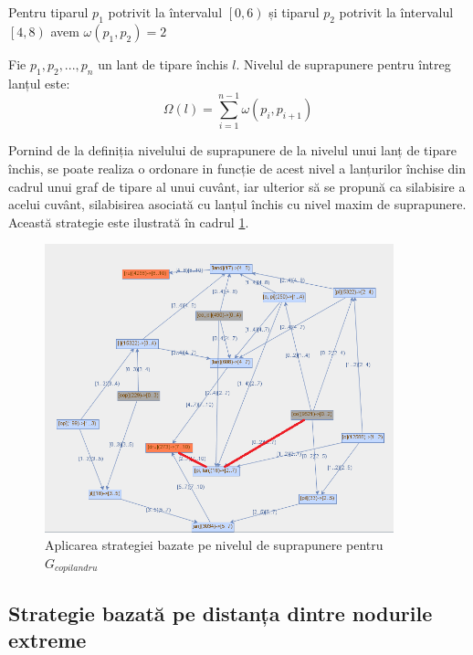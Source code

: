 \begin{ex}
Pentru tiparul $p_1$ potrivit la întervalul $\left[0, 6\right)$ și tiparul $p_2$ potrivit la întervalul $\left[4, 8\right)$ avem $ \omega(p_1,p_2)=2$
\end{ex}

\begin{defi}
Fie $p_1, p_2, ..., p_n$ un lant de tipare închis $l$. Nivelul de suprapunere pentru întreg lanțul este:
\begin{equation}
\Omega(l) = \sum_{i=1}^{n-1}{ \omega(p_i, p_{i+1})}
\end{equation}
\end{defi}

Pornind de la definiția nivelului de suprapunere de la nivelul unui lanț de tipare închis, se poate realiza o ordonare in funcție de acest nivel a lanțurilor închise din cadrul unui graf de tipare al unui cuvânt, iar ulterior să se propună ca silabisire a acelui cuvânt, silabisirea asociată cu lanțul închis cu nivel maxim de suprapunere. Această strategie este ilustrată în cadrul \ref{fig:rosil-overlapping}.


\begin{figure}[h!]
    \centering
    \includegraphics[width=0.9\textwidth]{figures/rosil-overlapping.png}
    \caption{Aplicarea strategiei bazate pe nivelul de suprapunere pentru $G_{copilandru}$}
    \label{fig:rosil-overlapping}
\end{figure}

\subsection{Strategie bazată pe distanța dintre nodurile extreme}

